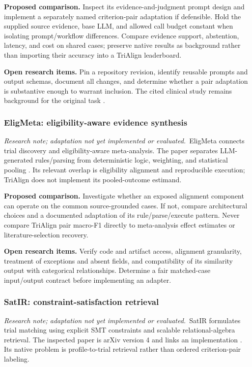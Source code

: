 \documentclass[10pt,letterpaper]{article}
\newcommand{\research}{\textit{Research note; adaptation not yet implemented or evaluated.}}
\begin{document}
\textbf{Proposed comparison.} Inspect its evidence-and-judgment prompt design
and implement a separately named criterion-pair adaptation if defensible.
Hold the supplied source evidence, base LLM, and allowed call budget constant
when isolating prompt/workflow differences. Compare evidence support,
abstention, latency, and cost on shared cases; preserve native results as
background rather than importing their accuracy into a TriAlign leaderboard.

\textbf{Open research items.} Pin a repository revision, identify reusable
prompts and output schemas, document all changes, and determine whether a
pair adaptation is substantive enough to warrant inclusion. The cited
clinical study remains background for the original task \cite{trialgpt}.

\subsubsection{EligMeta: eligibility-aware evidence synthesis}
\research\ EligMeta connects trial discovery and eligibility-aware
meta-analysis. The paper separates LLM-generated rules/parsing from
deterministic logic, weighting, and statistical pooling \cite{eligmeta}.
Its relevant overlap is eligibility alignment and reproducible execution;
TriAlign does not implement its pooled-outcome estimand.

\textbf{Proposed comparison.} Investigate whether an exposed alignment
component can operate on the common source-grounded cases. If not, compare
architectural choices and a documented adaptation of its rule/parse/execute
pattern. Never compare TriAlign pair macro-F1 directly to meta-analysis
effect estimates or literature-selection recovery.

\textbf{Open research items.} Verify code and artifact access, alignment
granularity, treatment of exceptions and absent fields, and compatibility of
its similarity output with categorical relationships. Determine a fair
matched-case input/output contract before implementing an adapter.

\subsubsection{SatIR: constraint-satisfaction retrieval}
\research\ SatIR formulates trial matching using explicit SMT constraints
and scalable relational-algebra retrieval. The inspected paper is arXiv
version 4 and links an implementation \cite{satir,satircode}. Its native
problem is profile-to-trial retrieval rather than ordered criterion-pair
labeling.
\end{document}
